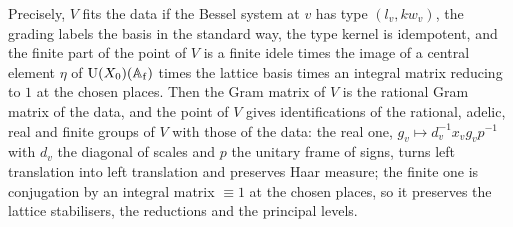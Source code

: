 Precisely, $V$ fits the data if the Bessel system at $v$ has type $(l_v,kw_v)$, the grading labels the basis in the standard way, the type kernel is idempotent, and the finite part of the point of $V$ is a finite idele times the image of a central
element $\eta$ of $\operatorname{U}(X_0)(\mathbb{A}_{\rm f})$ times the lattice basis times an integral matrix reducing to $1$ at the chosen places. Then the Gram matrix of $V$ is the rational Gram matrix of the data, and the point of $V$ gives identifications of the
rational, adelic, real and finite groups of $V$ with those of the data: the real one, $g_v\mapsto d_v^{-1}x_vg_vp^{-1}$ with $d_v$ the diagonal of scales and $p$ the unitary frame of signs, turns left translation into left translation and preserves Haar
measure; the finite one is conjugation by an integral matrix $\equiv1$ at the chosen places, so it preserves the lattice stabilisers, the reductions and the principal levels.

